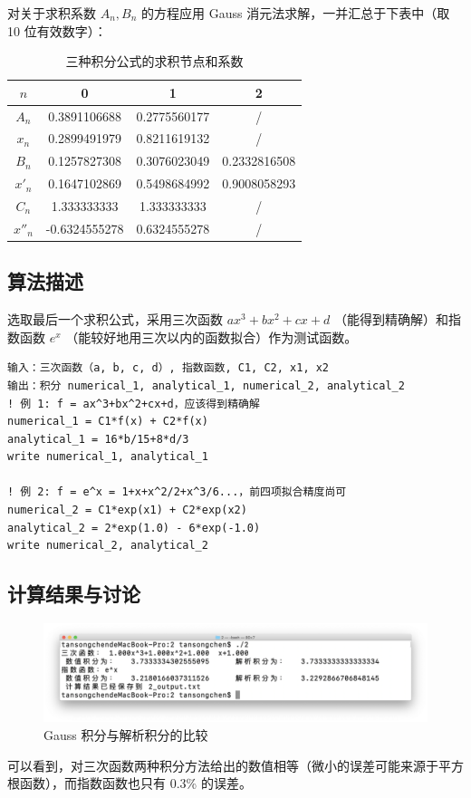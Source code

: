 \documentclass{ctexart}
\begin{document}
对关于求积系数 $A_n,B_n$ 的方程应用 Gauss 消元法求解，一并汇总于下表中（取 10 位有效数字）：

\begin{table}[h]
\centering
\caption{三种积分公式的求积节点和系数}
\begin{tabular}{cccc}
\toprule
$n$ & 0 & 1 & 2 \\
\midrule
$A_n$ & 0.3891106688 & 0.2775560177 & / \\
$x_n$ & 0.2899491979 & 0.8211619132 & / \\
$B_n$ & 0.1257827308 & 0.3076023049 & 0.2332816508 \\
$x'_n$ & 0.1647102869 & 0.5498684992 & 0.9008058293 \\
$C_n$ & 1.333333333 & 1.333333333 & / \\
$x''_n$ & -0.6324555278 & 0.6324555278 & / \\
\bottomrule
\end{tabular}
\end{table}
\subsection{算法描述}
选取最后一个求积公式，采用三次函数 $ax^3+bx^2+cx+d$ （能得到精确解）和指数函数 $e^x$ （能较好地用三次以内的函数拟合）作为测试函数。
\begin{lstlisting}
输入：三次函数（a, b, c, d）, 指数函数, C1, C2, x1, x2
输出：积分 numerical_1, analytical_1, numerical_2, analytical_2
! 例 1: f = ax^3+bx^2+cx+d，应该得到精确解
numerical_1 = C1*f(x) + C2*f(x)
analytical_1 = 16*b/15+8*d/3
write numerical_1, analytical_1

! 例 2: f = e^x = 1+x+x^2/2+x^3/6...，前四项拟合精度尚可
numerical_2 = C1*exp(x1) + C2*exp(x2)
analytical_2 = 2*exp(1.0) - 6*exp(-1.0)
write numerical_2, analytical_2
\end{lstlisting}
\subsection{计算结果与讨论}
\begin{figure}[h]
\includegraphics[scale = 0.3]{gauss.png}
\caption{Gauss 积分与解析积分的比较}
\end{figure}
可以看到，对三次函数两种积分方法给出的数值相等（微小的误差可能来源于平方根函数），而指数函数也只有 0.3\% 的误差。
\end{document}
